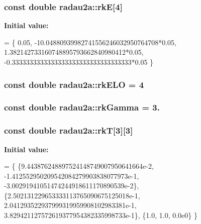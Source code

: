 \subsubsection[{\texorpdfstring{rkE}{rkE}}]{\setlength{\rightskip}{0pt plus 5cm}const double radau2a\+::rkE\mbox{[}4\mbox{]}\hspace{0.3cm}{\ttfamily [static]}}\hypertarget{group__Parameters_gae792ec3177ed6d29903669bcde591f94}{}\label{group__Parameters_gae792ec3177ed6d29903669bcde591f94}
{\bfseries Initial value\+:}
\begin{DoxyCode}
= \{
    0.05,
    -10.04880939982741556246032950764708*0.05,
    1.382142733160748895793662840980412*0.05,
    -0.3333333333333333333333333333333333*0.05
    \}
\end{DoxyCode}
\subsubsection[{\texorpdfstring{rk\+E\+LO}{rkELO}}]{\setlength{\rightskip}{0pt plus 5cm}const double radau2a\+::rk\+E\+LO = 4\hspace{0.3cm}{\ttfamily [static]}}\hypertarget{group__Parameters_ga8f0bf108626219e500ffe0b78c01b246}{}\label{group__Parameters_ga8f0bf108626219e500ffe0b78c01b246}
\subsubsection[{\texorpdfstring{rk\+Gamma}{rkGamma}}]{\setlength{\rightskip}{0pt plus 5cm}const double radau2a\+::rk\+Gamma = 3.\hspace{0.3cm}{\ttfamily [static]}}\hypertarget{group__Parameters_ga188fa0b309eb2826403d911684735824}{}\label{group__Parameters_ga188fa0b309eb2826403d911684735824}
\subsubsection[{\texorpdfstring{rkT}{rkT}}]{\setlength{\rightskip}{0pt plus 5cm}const double radau2a\+::rkT\mbox{[}3\mbox{]}\mbox{[}3\mbox{]}\hspace{0.3cm}{\ttfamily [static]}}\hypertarget{group__Parameters_gac217dadb5a83f73958dba436ae4fa415}{}\label{group__Parameters_gac217dadb5a83f73958dba436ae4fa415}
{\bfseries Initial value\+:}
\begin{DoxyCode}
= \{
\{9.443876248897524148749007950641664e-2,
-1.412552950209542084279903838077973e-1,
-3.00291941051474244918611170890539e-2\},
\{2.502131229653333113765090675125018e-1,
2.041293522937999319959908102983381e-1,
3.829421127572619377954382335998733e-1\},
\{1.0,
1.0,
0.0e0\}
\}
\end{DoxyCode}
